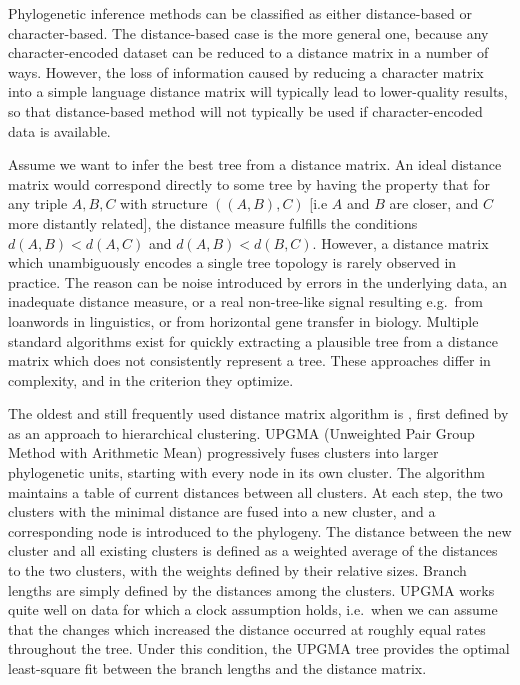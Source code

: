 Phylogenetic inference methods can be classified as either distance-based or character-based. The distance-based case is the more general one, because any character-encoded dataset can be reduced to a distance matrix in a number of ways. However, the loss of information caused by reducing a character matrix into a simple language distance matrix will typically lead to lower-quality results, so that distance-based method will not typically be used if character-encoded data is available.

Assume we want to infer the best tree from a distance matrix. An ideal distance matrix would correspond directly to some tree by having the property that for any triple $A,B,C$ with structure $((A,B),C)$ [i.e $A$ and $B$ are closer, and $C$ more distantly related], the distance measure fulfills the conditions $d(A,B) < d(A,C)$ and $d(A,B) < d(B,C)$. However, a distance matrix which unambiguously encodes a single tree topology is rarely observed in practice. The reason can be noise introduced by errors in the underlying data, an inadequate distance measure, or a real non-tree-like signal resulting e.g.\ from loanwords in linguistics, or from horizontal gene transfer in biology. Multiple standard algorithms exist for quickly extracting a plausible tree from a distance matrix which does not consistently represent a tree. These approaches differ in complexity, and in the criterion they optimize.

The oldest and still frequently used distance matrix algorithm is , first defined by \citet{sokal_michener_1958} as an approach to hierarchical clustering. UPGMA (Unweighted Pair Group Method with Arithmetic Mean) progressively fuses clusters into larger phylogenetic units, starting with every node in its own cluster. The algorithm maintains a table of current distances between all clusters. At each step, the two clusters with the minimal distance are fused into a new cluster, and a corresponding node is introduced to the phylogeny. The distance between the new cluster and all existing clusters is defined as a weighted average of the distances to the two clusters, with the weights defined by their relative sizes. Branch lengths are simply defined by the distances among the clusters. UPGMA works quite well on data for which a clock assumption holds, i.e.\ when we can assume that the changes which increased the distance occurred at roughly equal rates throughout the tree. Under this condition, the 
UPGMA tree provides the optimal least-square fit between the branch lengths and the distance matrix.

